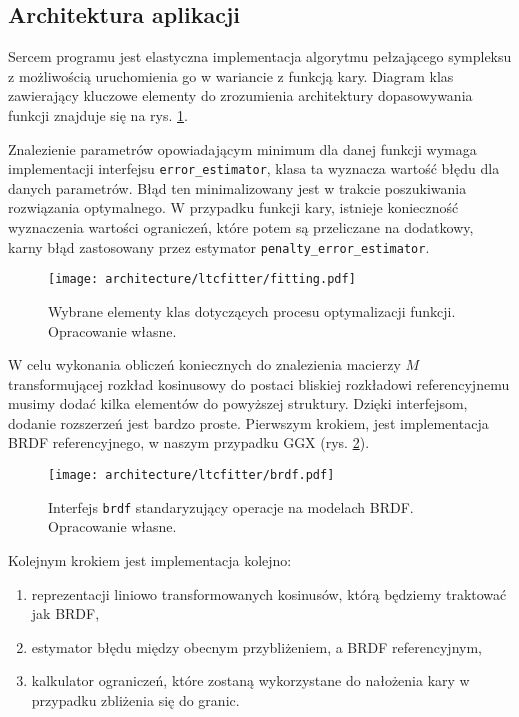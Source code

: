 \documentclass[../main.tex]{subfiles}
\newcommand{\graphvizscale}{0.09}
\begin{document}
\subsection{Architektura aplikacji}

Sercem programu jest elastyczna implementacja algorytmu pełzającego sympleksu z możliwością uruchomienia go w wariancie z funkcją kary. Diagram klas zawierający kluczowe elementy do zrozumienia architektury dopasowywania funkcji znajduje się na rys. \ref{fig:FunctionSolveClassDiagram}. 

Znalezienie parametrów opowiadającym minimum dla danej funkcji wymaga implementacji interfejsu \texttt{error\_estimator}, klasa ta wyznacza wartość błędu dla danych parametrów. Błąd ten minimalizowany jest w trakcie poszukiwania rozwiązania optymalnego. W przypadku funkcji kary, istnieje konieczność wyznaczenia wartości ograniczeń, które potem są przeliczane na dodatkowy, karny błąd zastosowany przez estymator \texttt{penalty\_error\_estimator}. 

\begin{figure}[h]
    \centering
    \texttt{[image: architecture/ltcfitter/fitting.pdf]}
    \caption{Wybrane elementy klas dotyczących procesu optymalizacji funkcji. Opracowanie własne.}
    \label{fig:FunctionSolveClassDiagram}
\end{figure}

W celu wykonania obliczeń koniecznych do znalezienia macierzy $M$ transformującej rozkład kosinusowy do postaci bliskiej rozkładowi referencyjnemu musimy dodać kilka elementów do powyższej struktury. Dzięki interfejsom, dodanie rozszerzeń jest bardzo proste. Pierwszym krokiem, jest implementacja BRDF referencyjnego, w naszym przypadku GGX (rys. \ref{fig:BRDFClassDiagram}).

\begin{figure}[h]
    \centering
    \texttt{[image: architecture/ltcfitter/brdf.pdf]}
    \caption{Interfejs \texttt{brdf} standaryzujący operacje na modelach BRDF. Opracowanie własne.}
    \label{fig:BRDFClassDiagram}
\end{figure}

Kolejnym krokiem jest implementacja kolejno: 
\begin{enumerate}
    \item reprezentacji liniowo transformowanych kosinusów, którą będziemy traktować jak BRDF,
    \item estymator błędu między obecnym przybliżeniem, a BRDF referencyjnym,
    \item kalkulator ograniczeń, które zostaną wykorzystane do nałożenia kary w przypadku zbliżenia się do granic.
\end{enumerate}
\end{document}
